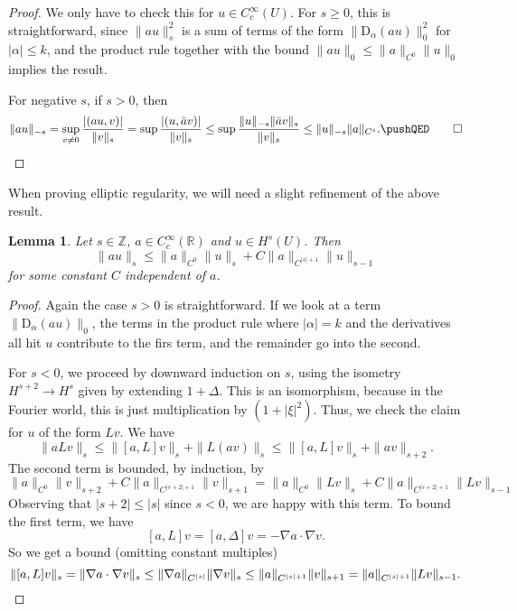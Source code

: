 \documentclass{shortart}
\newtheorem*{lemma}{Lemma}
\theoremstyle{definition}
\newcommand\R{\mathbb{R}}
\newcommand\Z{\mathbb{Z}}
\newcommand\D{\mathrm{D}}
\begin{document}
\begin{proof}
  We only have to check this for $u \in C_c^\infty(U)$. For $s \geq 0$, this is straightforward, since $\|au\|_s^2$ is a sum of terms of the form $\|\D_\alpha (au)\|_0^2$ for $|\alpha| \leq k$, and the product rule together with the bound $\|a u\|_0 \leq \|a\|_{C^0} \|u\|_0$ implies the result.
  
%
  For negative $s$, if $s > 0$, then
  \[
    \|au\|_{-s} = \sup_{v \not= 0} \frac{|(au, v)|}{\|v\|_s} = \sup \frac{|(u, \bar{a}v)|}{\|v\|_s} \leq \sup \frac{\|u\|_{-s} \|\bar{a}v\|_s}{\|v\|_s} \leq \|u\|_{-s} \|a\|_{C^s}.\fakeqed
  \]
\end{proof}
When proving elliptic regularity, we will need a slight refinement of the above result.
\begin{lemma}
   Let $s \in \Z$, $a \in C_c^\infty(\R)$ and $u \in H^s(U)$. Then
  \[
    \|au\|_s \leq \|a\|_{C^0} \|u\|_s + C \|a\|_{C^{|s| + 1}} \|u\|_{s - 1}
  \]
  for some constant $C$ independent of $a$.
\end{lemma}

\begin{proof}
  Again the case $s > 0$ is straightforward. If we look at a term $\|\D_\alpha(a u)\|_0$, the terms in the product rule where $|\alpha| = k$ and the derivatives all hit $u$ contribute to the firs term, and the remainder go into the second. 

  For $s < 0$, we proceed by downward induction on $s$, using the isometry $H^{s + 2} \to H^s$ given by extending $1 + \Delta$. This is an isomorphism, because in the Fourier world, this is just multiplication by $(1 + |\xi|^2)$. Thus, we check the claim for $u$ of the form $Lv$. We have
  \[
    \|a Lv\|_s \leq \|[a, L]v\|_s + \|L(av)\|_s \leq \|[a, L]v\|_s + \|av\|_{s + 2}.
  \]
  The second term is bounded, by induction, by
  \[
    \|a\|_{C^0} \|v\|_{s + 2} + C \|a\|_{C^{|s + 2| + 1}} \|v\|_{s + 1} = \|a\|_{C^0} \|Lv\|_s + C\|a\|_{C^{|s + 2| + 1}} \|Lv\|_{s - 1}
  \]
  Observing that $|s + 2| \leq |s|$ since $s < 0$, we are happy with this term. To bound the first term, we have
  \[
    [a, L]v = [a, \Delta]v = -\nabla a \cdot \nabla v.
  \]
  So we get a bound (omitting constant multiples)
  \[
    \|[a, L]v\|_s = \|\nabla a \cdot \nabla v\|_s \leq \|\nabla a\|_{C^{|s|}} \|\nabla v\|_{s} \leq \|a\|_{C^{|s| + 1}} \|v\|_{s + 1} = \|a\|_{C^{|s| + 1}} \|Lv\|_{s - 1}.\qedhere
  \]
\end{proof}
\end{document}
